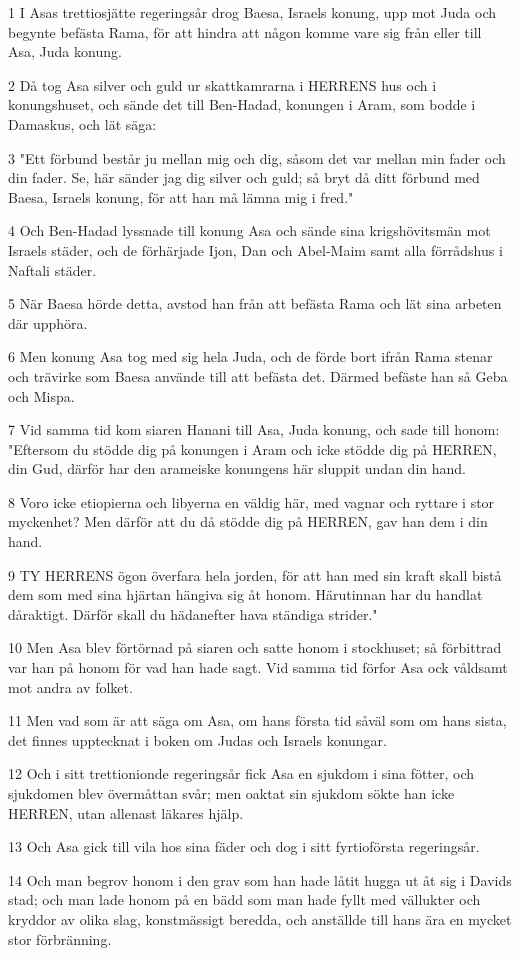\par 1 I Asas trettiosjätte regeringsår drog Baesa, Israels konung, upp mot Juda och begynte befästa Rama, för att hindra att någon komme vare sig från eller till Asa, Juda konung.
\par 2 Då tog Asa silver och guld ur skattkamrarna i HERRENS hus och i konungshuset, och sände det till Ben-Hadad, konungen i Aram, som bodde i Damaskus, och lät säga:
\par 3 "Ett förbund består ju mellan mig och dig, såsom det var mellan min fader och din fader. Se, här sänder jag dig silver och guld; så bryt då ditt förbund med Baesa, Israels konung, för att han må lämna mig i fred."
\par 4 Och Ben-Hadad lyssnade till konung Asa och sände sina krigshövitsmän mot Israels städer, och de förhärjade Ijon, Dan och Abel-Maim samt alla förrådshus i Naftali städer.
\par 5 När Baesa hörde detta, avstod han från att befästa Rama och lät sina arbeten där upphöra.
\par 6 Men konung Asa tog med sig hela Juda, och de förde bort ifrån Rama stenar och trävirke som Baesa använde till att befästa det. Därmed befäste han så Geba och Mispa.
\par 7 Vid samma tid kom siaren Hanani till Asa, Juda konung, och sade till honom: "Eftersom du stödde dig på konungen i Aram och icke stödde dig på HERREN, din Gud, därför har den arameiske konungens här sluppit undan din hand.
\par 8 Voro icke etiopierna och libyerna en väldig här, med vagnar och ryttare i stor myckenhet? Men därför att du då stödde dig på HERREN, gav han dem i din hand.
\par 9 TY HERRENS ögon överfara hela jorden, för att han med sin kraft skall bistå dem som med sina hjärtan hängiva sig åt honom. Härutinnan har du handlat dåraktigt. Därför skall du hädanefter hava ständiga strider."
\par 10 Men Asa blev förtörnad på siaren och satte honom i stockhuset; så förbittrad var han på honom för vad han hade sagt. Vid samma tid förfor Asa ock våldsamt mot andra av folket.
\par 11 Men vad som är att säga om Asa, om hans första tid såväl som om hans sista, det finnes upptecknat i boken om Judas och Israels konungar.
\par 12 Och i sitt trettionionde regeringsår fick Asa en sjukdom i sina fötter, och sjukdomen blev övermåttan svår; men oaktat sin sjukdom sökte han icke HERREN, utan allenast läkares hjälp.
\par 13 Och Asa gick till vila hos sina fäder och dog i sitt fyrtioförsta regeringsår.
\par 14 Och man begrov honom i den grav som han hade låtit hugga ut åt sig i Davids stad; och man lade honom på en bädd som man hade fyllt med vällukter och kryddor av olika slag, konstmässigt beredda, och anställde till hans ära en mycket stor förbränning.

